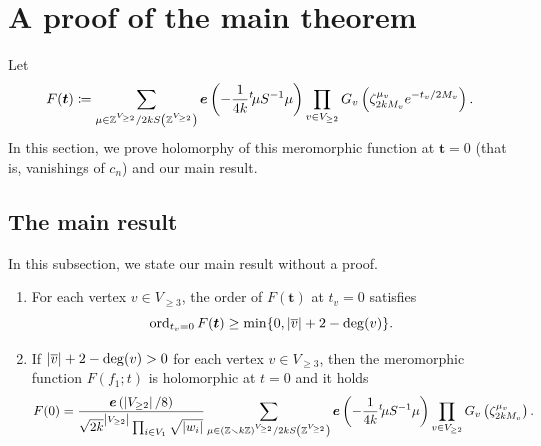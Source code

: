 \documentclass[11pt,a4paper,lualatex]{amsart}
\numberwithin{equation}{section} %
\begin{document}

\section{A proof of the main theorem} \label{sec:proof_main}


Let 
\[
F(\bm{t}) \coloneqq
\sum_{ \mu \in \Z^{V_{\ge 2}} / 2kS \left(\Z^{V_{\ge 2}} \right) } 
\bm{e} \left( -\frac{1}{4k} {}^t\!\mu S^{-1} \mu \right) 
\prod_{v \in V_{\ge 2}} G_v \left( \zeta_{2kM_v}^{\mu_v} e^{-t_v/2M_v} \right).
\]
In this section, we prove holomorphy of this meromorphic function at $ \bm{t} = 0 $ (that is, vanishings of $ c_n $) and our main result.


\subsection{The main result} \label{subsec:proof_main}


In this subsection, we state our main result without a proof.

\begin{prop} \label{prop:Gauss_vanish}
	\begin{enumerate}
		\item \label{item:prop:Gauss_vanish1}
		For each vertex $ v \in V_{\ge 3} $, the order of $ F(\bm{t}) $ at $ t_v=0 $ satisfies
		\[
		\operatorname{ord}_{t_v = 0} F(\bm{t})
		\ge
		\min \{ 0, \left\lvert\overline{v}\right\rvert + 2 - \deg(v) \}.
		\]
		
		\item \label{item:prop:Gauss_vanish2}
		If $ \left\lvert\overline{v}\right\rvert + 2 - \deg(v) > 0 $ for each vertex $ v \in V_{\ge 3} $, then the meromorphic function $ F(f_1; t) $ is holomorphic at $ t=0 $ and it holds
		\begin{equation} \label{eq:F(f_1;0)}
			F(0) 
			= 
			\frac{\bm{e} \left( \left\lvert V_{\ge 2}\right\rvert/8 \right)}{\sqrt{2k}^{\left\lvert V_{\ge 2}\right\rvert} \prod_{i \in V_1} \sqrt{\left\lvert w_i\right\rvert}}
			\sum_{ \mu \in (\mathbb{Z} \smallsetminus k\mathbb{Z})^{V_{\ge 2}} / 2kS \left(\mathbb{Z}^{V_{\ge 2}} \right) } 
			\bm{e} \left( -\frac{1}{4k} {}^t\!\mu S^{-1} \mu \right) 
			\prod_{v \in V_{\ge 2}} G_v \left( \zeta_{2kM_v}^{\mu_v} \right).
		\end{equation}
	\end{enumerate}
\end{prop}
\end{document}
